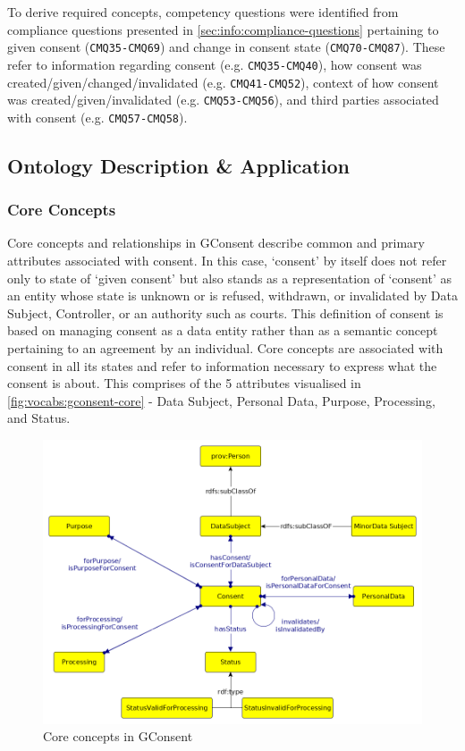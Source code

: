 To derive required concepts, competency questions were identified from compliance questions presented in \autoref{sec:info:compliance-questions} pertaining to given consent (\texttt{CMQ35-CMQ69}) and change in consent state (\texttt{CMQ70-CMQ87}).
These refer to information regarding consent (e.g. \texttt{CMQ35-CMQ40}), how consent was created/given/changed/invalidated (e.g. \texttt{CMQ41-CMQ52}), context of how consent was created/given/invalidated (e.g. \texttt{CMQ53-CMQ56}), and third parties associated with consent (e.g. \texttt{CMQ57-CMQ58}).

\subsection{Ontology Description \& Application}
\subsubsection{Core Concepts}
Core concepts and relationships in GConsent describe common and primary attributes associated with consent.
In this case, `consent' by itself does not refer only to state of `given consent' but also stands as a representation of `consent' as an entity whose state is unknown or is refused, withdrawn, or invalidated by Data Subject, Controller, or an authority such as courts. This definition of consent is based on managing consent as a data entity rather than as a semantic concept pertaining to an agreement by an individual. 
Core concepts are associated with consent in all its states and refer to information necessary to express what the consent is about. This comprises of the 5 attributes visualised in \autoref{fig:vocabs:gconsent-core} - Data Subject, Personal Data, Purpose, Processing, and Status.
\begin{figure}[htbp]
    \centering
    \includegraphics[width=0.8\linewidth]{img/gconsent_core.png}
    \caption{Core concepts in GConsent \cite{pandit_gconsent_2019}}
    \label{fig:vocabs:gconsent-core}
\end{figure}

